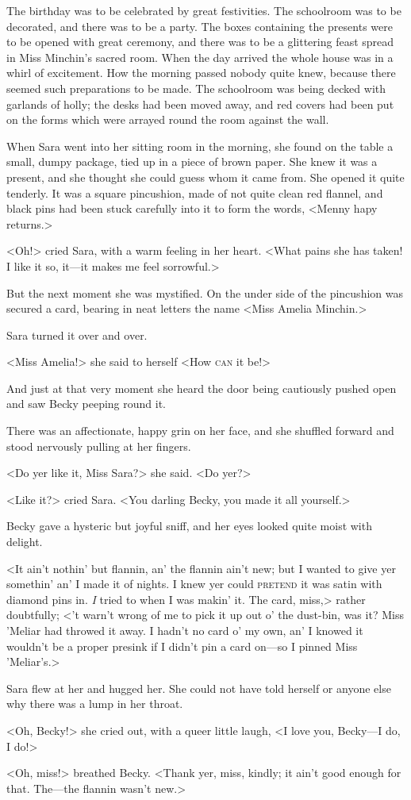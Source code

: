 The birthday was to be celebrated by great festivities. The schoolroom was to be decorated, and there was to be a party. The boxes containing the presents were to be opened with great ceremony, and there was to be a glittering feast spread in Miss Minchin's sacred room. When the day arrived the whole house was in a whirl of excitement. How the morning passed nobody quite knew, because there seemed such preparations to be made. The schoolroom was being decked with garlands of holly; the desks had been moved away, and red covers had been put on the forms which were arrayed round the room against the wall.

When Sara went into her sitting room in the morning, she found on the table a small, dumpy package, tied up in a piece of brown paper. She knew it was a present, and she thought she could guess whom it came from. She opened it quite tenderly. It was a square pincushion, made of not quite clean red flannel, and black pins had been stuck carefully into it to form the words, <Menny hapy returns.>

<Oh!> cried Sara, with a warm feeling in her heart. <What pains she has taken! I like it so, it—it makes me feel sorrowful.>

But the next moment she was mystified. On the under side of the pincushion was secured a card, bearing in neat letters the name <Miss Amelia Minchin.>

Sara turned it over and over.

<Miss Amelia!> she said to herself <How \textsc{can} it be!>

And just at that very moment she heard the door being cautiously pushed open and saw Becky peeping round it.

There was an affectionate, happy grin on her face, and she shuffled forward and stood nervously pulling at her fingers.

<Do yer like it, Miss Sara?> she said. <Do yer?>

<Like it?> cried Sara. <You darling Becky, you made it all yourself.>

Becky gave a hysteric but joyful sniff, and her eyes looked quite moist with delight.

<It ain't nothin' but flannin, an' the flannin ain't new; but I wanted to give yer somethin' an' I made it of nights. I knew yer could \textsc{pretend} it was satin with diamond pins in. \textit{I} tried to when I was makin' it. The card, miss,> rather doubtfully; <'t warn't wrong of me to pick it up out o' the dust-bin, was it? Miss 'Meliar had throwed it away. I hadn't no card o' my own, an' I knowed it wouldn't be a proper presink if I didn't pin a card on—so I pinned Miss 'Meliar's.>

Sara flew at her and hugged her. She could not have told herself or anyone else why there was a lump in her throat.

<Oh, Becky!> she cried out, with a queer little laugh, <I love you, Becky—I do, I do!>

<Oh, miss!> breathed Becky. <Thank yer, miss, kindly; it ain't good enough for that. The—the flannin wasn't new.>